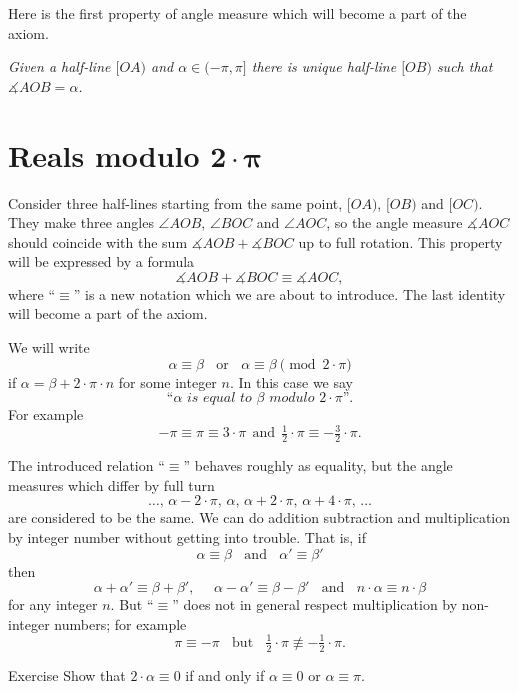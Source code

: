 Here is the first property of angle measure which will become a part of the axiom.

\textit{Given a half-line $[O A)$ and $\alpha\in(-\pi,\pi]$ there is unique  half-line $[O B)$ such that $\measuredangle A O B= \alpha$.}





\section*{Reals modulo $\bm{2\cdot\pi}$}

Consider three half-lines starting from the same point,
 $[O A)$, $[O B)$ and $[O C)$.
They make three angles $\angle A O B$, $\angle B O C$ and $\angle A O C$,
so the angle measure $\measuredangle A O C$ should coincide with
the sum $\measuredangle A O B+\measuredangle B O C$ up to full rotation.
This property will be expressed by a formula 
$$\measuredangle A O B+\measuredangle B O C\equiv \measuredangle A O C,$$
where ``$\equiv$'' is a new notation which we are about to introduce.
The last identity will become a part of the axiom.

We will write 
$$\alpha\equiv\beta\ \ \ \ \text{or}\ \ \ \  \alpha\equiv\beta\pmod{2\cdot\pi}$$ if $\alpha=\beta+2\cdot\pi\cdot n$
for some integer $n$.
In this case we say 
$$\textit{``$\alpha$ is equal to $\beta$ modulo $2\cdot\pi$''}.$$
For example 
$$-\pi\equiv \pi\equiv 3\cdot\pi\ \  \text{and}
\ \ \tfrac12\cdot\pi\equiv-\tfrac32\cdot\pi.$$

The introduced relation ``$\equiv$'' behaves roughly as equality, 
but the angle measures which differ by full turn 
\[\dots,\,\alpha-2\cdot\pi,\, \alpha,\, \alpha+2\cdot\pi,\, \alpha+4\cdot\pi,\,\dots\] 
are considered to be the same.
We can do addition subtraction and multiplication by integer number without getting into trouble.
That is, if
$$\alpha\equiv\beta\ \ \ \ \text{and}\ \ \ \ \alpha'\equiv \beta'$$ 
then
$$\alpha+\alpha'\equiv\beta+\beta',\ \ \ \ \ \ \alpha-\alpha'\equiv \beta-\beta'\ \ \ \ 
\text{and}\ \ \ \ n\cdot\alpha\equiv n\cdot\beta$$
for any integer $n$.
But ``$\equiv$'' does not in general respect multiplication by non-integer numbers; for example 
$$\pi\equiv -\pi\ \ \ \ \text{but}\ \ \ \ \tfrac12\cdot\pi\not\equiv -\tfrac12\cdot\pi.$$ 

\begin{thm}{Exercise}\label{ex:2a=0}
Show that $2\cdot\alpha\equiv0$ if and only if $\alpha\equiv0$ or $\alpha\equiv\pi$.
\end{thm}

